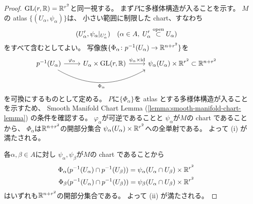 \documentclass[report]{jlreq}
\begin{document}
\begin{proof}
    $\operatorname{\mathrm{GL}}(r, \mathbb{R}) = \mathbb{R}^{r^2}$と同一視する。
    まず$P$に多様体構造が入ることを示す。
    $M$の atlas $\{ (U_\alpha, \psi_\alpha) \}$は、
    小さい範囲に制限した chart、すなわち
    \begin{equation}
        (U'_\alpha, \psi_\alpha|_{U'_\alpha})
        \quad
        (\alpha \in A, \; U'_\alpha \stackrel{\text{open}}{\subset} U_\alpha)
    \end{equation}
    をすべて含むとしてよい。
    写像族$\{ \Phi_\alpha \colon p^{-1}(U_\alpha) \to \mathbb{R}^{n + r^2} \}$を
    \begin{equation}
        \begin{tikzcd}
            p^{-1}(U_\alpha)
                \ar{r}{\varphi_\alpha}
                \ar[bend right=30, end anchor=south west]{rr}[swap]{\Phi_\alpha}
                & U_\alpha \times \GL(r, \R)
                \ar{r}{\psi_\alpha \times \id}
                & \psi_\alpha(U_\alpha) \times \R^{r^2}
                \subset \R^{n + r^2}
        \end{tikzcd}
    \end{equation}
    を可換にするものとして定める。
    $P$に$\{ \Phi_\alpha \}$を atlas とする多様体構造が入ることを示すため、
    Smooth Manifold Chart Lemma (\cref{lemma:smooth-manifold-chart-lemma})
    の条件を確認する。
    $\varphi_\alpha$が可逆であることと
    $\psi_\alpha$が$M$の chart であることから、
    $\Phi_\alpha$は$\mathbb{R}^{n + r^2}$の開部分集合
    $\psi_\alpha(U_\alpha) \times \mathbb{R}^{r^2}$への全単射である。
    よって (i) が満たされる。

    各$\alpha, \beta \in A$に対し
    $\psi_\alpha, \psi_\beta$が$M$の chart であることから
    \begin{align}
        \Phi_\alpha(p^{-1}(U_\alpha) \cap p^{-1}(U_\beta))
            = \psi_\alpha(U_\alpha \cap U_\beta) \times \mathbb{R}^{r^2} \\
        \Phi_\beta(p^{-1}(U_\alpha) \cap p^{-1}(U_\beta))
            = \psi_\beta(U_\alpha \cap U_\beta) \times \mathbb{R}^{r^2}
    \end{align}
    はいずれも$\mathbb{R}^{n + r^2}$の開部分集合である。
    よって (ii) が満たされる。


\end{proof}
\end{document}
